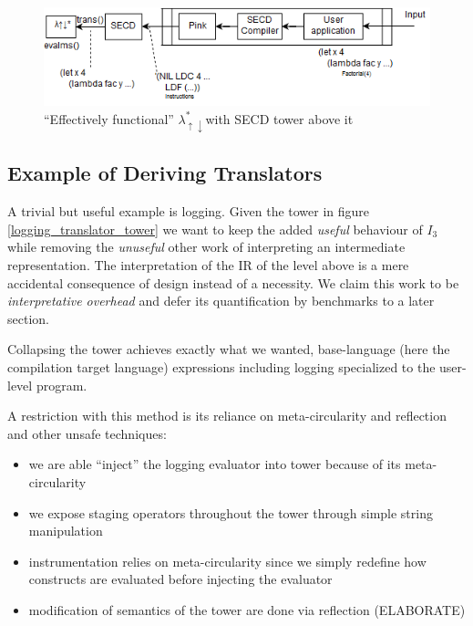 \documentclass[fleqn]{article}
\theoremstyle{definition}
\newcommand{\mslangStar}{$\lambda_{\uparrow\downarrow}^*$}
\begin{document}
\begin{figure}[t]
	\centering
	\includegraphics[scale=0.75]{secd_arch.png}
	\caption{``Effectively functional'' \mslangStar with SECD tower above it}\label{secd_tower_arch}
\end{figure}

\subsection{Example of Deriving Translators}
A trivial but useful example is logging. Given the tower in figure \ref{logging_translator_tower} we want to keep the added \textit{useful} behaviour of $I_3$ while removing the \textit{unuseful} other work of interpreting an intermediate representation. The interpretation
of the IR of the level above is a mere accidental consequence of design instead of a necessity. We claim this work to be \textit{interpretative overhead} and defer its quantification by benchmarks to a later section.

Collapsing the tower achieves exactly what we wanted, base-language (here the compilation target language) expressions including logging specialized to the user-level program.

A restriction with this method is its reliance on meta-circularity and reflection and other unsafe techniques:
\begin{itemize}
	\item we are able ``inject'' the logging evaluator into tower because of its meta-circularity
	\item we expose staging operators throughout the tower through simple string manipulation
	\item instrumentation relies on meta-circularity since we simply redefine how constructs are evaluated before injecting the evaluator
	\item modification of semantics of the tower are done via reflection (ELABORATE)
\end{itemize}
\end{document}
